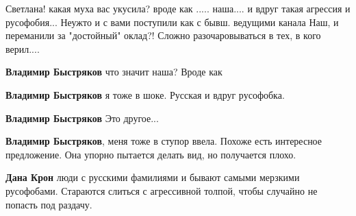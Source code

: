 \begin{itemize}
Светлана! какая муха вас укусила? вроде как ..... наша.... и вдруг такая
агрессия и русофобия... Неужто и с вами поступили как с бывш. ведущими канала
Наш, и переманили за "достойный" оклад?! Сложно разочаровываться в тех, в кого
верил....

\begin{itemize}
 
\textbf{Владимир Быстряков} что значит наша? Вроде как

 
\textbf{Владимир Быстряков} я тоже в шоке. Русская и вдруг русофобка.

 
\textbf{Владимир Быстряков} Это другое...

 
\textbf{Владимир Быстряков}, меня тоже в ступор ввела. Похоже есть интересное предложение. Она упорно пытается делать вид, но получается плохо.

 
\textbf{Дана Крон} люди с русскими фамилиями и бывают самыми мерзкими русофобами. Стараются слиться с агрессивной толпой, чтобы случайно не попасть под раздачу.

 

\end{itemize}
\end{itemize}
